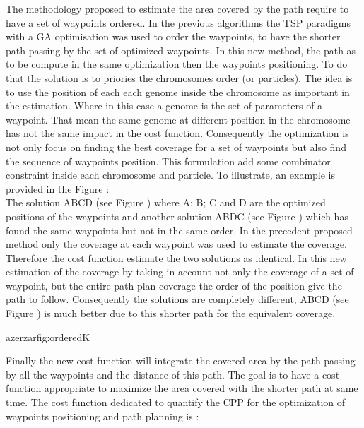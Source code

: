 The methodology proposed to estimate the area covered by the path require to have a set of waypoints ordered.  In the previous algorithms the TSP paradigms with a GA optimisation was used to order the waypoints, to have the shorter path passing by the set of optimized waypoints. In this new method, the path as to be compute in the same optimization then the waypoints positioning. 
To do that the solution is to priories the chromosomes order (or particles). The idea is to use the position of each each genome inside the chromosome as important in the estimation. Where in this case a genome is the set of parameters of a waypoint. That mean the same genome at different position in the chromosome has not the same impact in the cost function. Consequently the optimization is not only focus on finding the best coverage for a set of waypoints but also find the sequence of waypoints position. This formulation add some combinator constraint inside each chromosome and particle.
To illustrate, an example is provided in the Figure  : \\
The solution ABCD (see Figure ) where A; B; C and D are the optimized positions of the waypoints and another solution  ABDC (see Figure ) which has found the same waypoints but not in the same order. In the precedent proposed method only the coverage at each waypoint was used to estimate the coverage. Therefore the cost function estimate the two solutions as identical. 
In this new estimation of the coverage by taking in account not only the coverage of a set of waypoint, but the entire path plan coverage the order of the position give the path to follow. Consequently the solutions are completely different, ABCD (see Figure ) is much better due to this shorter path for the equivalent coverage.
  \begin{mfigures}[!]{azerzar}{fig:orderedK} \centering
\end{mfigures}   

 Finally the new cost function will integrate the covered area by the path passing  by all the waypoints and the distance of this path. The goal is to have a cost function appropriate to maximize the area covered with the shorter path at same time.
 The cost function dedicated to quantify the CPP for the optimization of waypoints positioning and path planning is :
 

